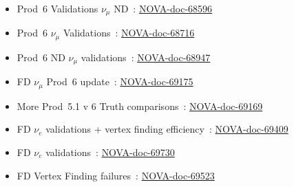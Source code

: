 \documentclass{article}
\begin{document}
\begin{itemize}
    \item Prod~6 Validations $\nu_{\mu}$ ND~\cite{ochow-nd-numu-init}: \href{https://nova-docdb.fnal.gov/cgi-bin/sso/ShowDocument?docid=68596}{NOVA-doc-68596}
    \item Prod~6 $\nu_{\mu}$ Validations~\cite{ochow-nd-numu-mctomc}: \href{https://nova-docdb.fnal.gov/cgi-bin/sso/ShowDocument?docid=68716}{NOVA-doc-68716}
    \item Prod~6 ND $\nu_{\mu}$ validations~\cite{ochow-nd-numu-cvn}: \href{https://nova-docdb.fnal.gov/cgi-bin/sso/ShowDocument?docid=68947}{NOVA-doc-68947}
    \item FD $\nu_{\mu}$ Prod~6 update~\cite{ochow-fd-numu-sel}: \href{https://nova-docdb.fnal.gov/cgi-bin/private/ShowDocument?docid=69175}{NOVA-doc-69175}
    \item More Prod~5.1 v 6 Truth comparisons~\cite{tricia-xsec-prod6}: \href{https://nova-docdb.fnal.gov/cgi-bin/private/ShowDocument?docid=69169}{NOVA-doc-69169}
    \item FD $\nu_e$ validations + vertex finding efficiency~\cite{ochow-fd-nue-vtx}: \href{https://nova-docdb.fnal.gov/cgi-bin/private/ShowDocument?docid=69409}{NOVA-doc-69409}
    \item FD $\nu_e$ validations~\cite{ochow-fd-nue-2}: \href{https://nova-docdb.fnal.gov/cgi-bin/private/ShowDocument?docid=69730}{NOVA-doc-69730}
    \item FD Vertex Finding failures~\cite{ochow-fd-vertex-2}: \href{https://nova-docdb.fnal.gov/cgi-bin/private/ShowDocument?docid=69523}{NOVA-doc-69523}
\end{itemize}



\end{document}
